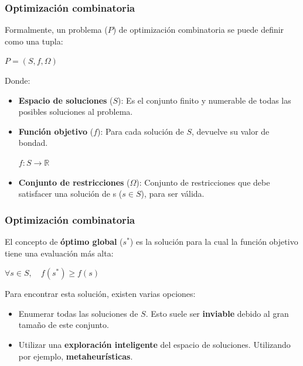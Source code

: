 \documentclass{beamer}
\begin{document}
\begin{frame}
\frametitle{Optimización combinatoria}

Formalmente, un problema ($P$) de optimización combinatoria se puede definir como una tupla:

\begin{center}
    $P = (S, f, \Omega)$
\end{center}

Donde:

\begin{itemize}
    \item \textbf{Espacio de soluciones} ($S$): Es el conjunto finito y numerable de todas las posibles soluciones al problema.
    \item \textbf{Función objetivo} ($f$): Para cada solución de $S$, devuelve su valor de bondad.
    \begin{center}
        \begin{math}
            f: S \rightarrow \mathbb{R}
        \end{math}
    \end{center}
    \item \textbf{Conjunto de restricciones} ($\Omega$): Conjunto de restricciones que debe satisfacer una solución de s ($s \in S$), para ser válida.
\end{itemize}

\end{frame}

\begin{frame}
\frametitle{Optimización combinatoria}

El concepto de \textbf{óptimo global} ($s^*$) es la solución para la cual la función objetivo tiene una evaluación más alta:

\begin{center}
    $\forall s \in S, \quad f(s^*) \geq f(s)$ 
\end{center}

Para encontrar esta solución, existen varias opciones:

\begin{itemize}
    \item Enumerar todas las soluciones de $S$. Esto suele ser \textbf{inviable} debido al gran tamaño de este conjunto.
    \item Utilizar una \textbf{exploración inteligente} del espacio de soluciones. Utilizando por ejemplo, \textbf{metaheurísticas}.
\end{itemize}

\end{frame}
\end{document}
